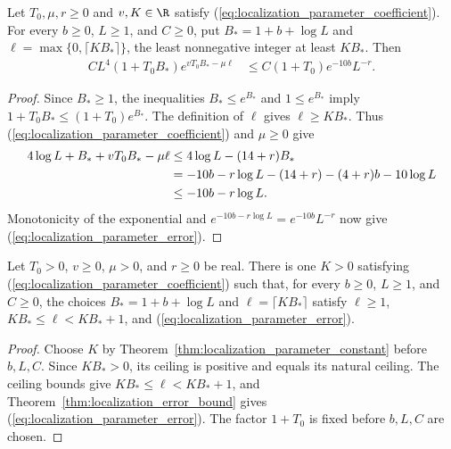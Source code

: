 \begin{theorem}
    \label{thm:localization_error_bound}
    \leanok
    Let $T_0,\mu,r\ge0$ and $v,K\in\R$ satisfy
    (\ref{eq:localization_parameter_coefficient}). For every
    $b\ge0$, $L\ge1$, and $C\ge0$, put $B_*=1+b+\log L$ and
    $\ell=\max\{0,\lceil KB_*\rceil\}$, the least nonnegative integer
    at least $KB_*$. Then
    \begin{align}
        CL^4(1+T_0B_*)e^{vT_0B_*-\mu\ell}
        &\le C(1+T_0)e^{-10b}L^{-r}.
        \label{eq:localization_parameter_error}
    \end{align}
\end{theorem}
\begin{proof}
    \leanok
    Since $B_*\ge1$, the inequalities $B_*\le e^{B_*}$ and
    $1\le e^{B_*}$ imply $1+T_0B_*\le(1+T_0)e^{B_*}$.
    The definition of $\ell$ gives $\ell\ge KB_*$. Thus
    (\ref{eq:localization_parameter_coefficient}) and $\mu\ge0$ give
    \begin{align}
        4\log L+B_*+vT_0B_*-\mu\ell
        &\le4\log L-(14+r)B_*
        \label{eq:localization_parameter_exponent}\\
        &=-10b-r\log L-(14+r)-(4+r)b-10\log L \notag\\
        &\le-10b-r\log L. \notag
    \end{align}
    Monotonicity of the exponential and
    $e^{-10b-r\log L}=e^{-10b}L^{-r}$ now give
    (\ref{eq:localization_parameter_error}).
\end{proof}

\begin{theorem}
    \label{thm:localization_parameters}
    \leanok
    Let $T_0>0$, $v\ge0$, $\mu>0$, and $r\ge0$ be real. There is
    one $K>0$ satisfying (\ref{eq:localization_parameter_coefficient})
    such that, for every $b\ge0$, $L\ge1$, and $C\ge0$, the choices
    $B_*=1+b+\log L$ and $\ell=\lceil KB_*\rceil$ satisfy
    $\ell\ge1$, $KB_*\le\ell<KB_*+1$, and
    (\ref{eq:localization_parameter_error}).
\end{theorem}
\begin{proof}
    \leanok
    Choose $K$ by Theorem~\ref{thm:localization_parameter_constant}
    before $b,L,C$. Since $KB_*>0$, its ceiling is positive and equals
    its natural ceiling. The ceiling bounds give
    $KB_*\le\ell<KB_*+1$, and
    Theorem~\ref{thm:localization_error_bound} gives
    (\ref{eq:localization_parameter_error}). The factor $1+T_0$ is
    fixed before $b,L,C$ are chosen.
\end{proof}
